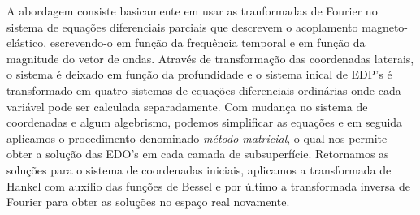 A abordagem consiste basicamente em usar as tranformadas de Fourier no sistema de equa\c{c}\~oes diferenciais parciais que descrevem o acoplamento magneto-el\'astico, escrevendo-o em fun\c{c}\~ao da frequ\^encia temporal e em fun\c{c}\~ao da magnitude do vetor de ondas. Atrav\'es de transforma\c{c}\~ao das coordenadas laterais, o sistema \'e deixado em fun\c{c}\~ao da profundidade e o sistema inical de EDP's \'e transformado em quatro sistemas de equa\c{c}\~oes diferenciais ordin\'arias onde cada variável pode ser calculada separadamente. Com mudan\c{c}a no sistema de coordenadas e algum algebrismo, podemos simplificar as equa\c{c}\~oes e em seguida aplicamos o procedimento denominado \textit{m\'etodo matricial}, o qual nos permite obter a solu\c{c}\~ao das EDO's em cada camada de subsuperf\'icie. Retornamos as solu\c{c}\~oes para o sistema de coordenadas iniciais, aplicamos a transformada de Hankel com aux\'ilio das fun\c{c}\~oes de Bessel e por \'ultimo a transformada inversa de Fourier para obter as solu\c{c}\~oes no espa\c{c}o real novamente.